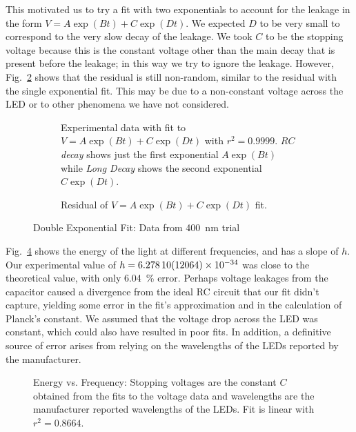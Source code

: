 \documentclass{lab}
\begin{document}
This motivated us to try a fit with two exponentials to account for the leakage
in the form $V = A\exp(Bt) + C\exp(Dt)$. We expected $D$ to be very small to
correspond to the very slow decay of the leakage. We took $C$ to be the stopping
voltage because this is the constant voltage other than the main decay that is
present before the leakage; in this way we try to ignore the leakage. However,
Fig.~\ref{fig:complex_resid} shows that the residual is still non-random,
similar to the residual with the single exponential fit. This may be due to a
non-constant voltage across the LED or to other phenomena we have not
considered.

\begin{figure}[h]
  \centering
  \begin{subfigure}{0.48\textwidth}
    \centering
    
    \caption{Experimental data with fit to $V = A\exp(Bt) + C\exp(Dt)$ with $r^2
      = 0.9999$. \textit{$RC$ decay} shows just the first exponential
      $A\exp(Bt)$ while\textit{ Long Decay} shows the second exponential
      $C\exp(Dt)$.\label{fig:complex_fit}}
  \end{subfigure}
  \hfill
  \begin{subfigure}{0.48\textwidth}
    \centering
    
    \caption{Residual of $V = A\exp(Bt) + C\exp(Dt)$
      fit.\label{fig:complex_resid}}
  \end{subfigure}
  \caption{Double Exponential Fit: Data from \SI{400}{\nano\meter}
    trial\label{fig:complex}}
\end{figure}

Fig.~\ref{fig:evsf} shows the energy of the light at different frequencies, and
has a slope of $h$. Our experimental value of $h = \num{6.2781 +- .12064 e-34}$
was close to the theoretical value, with only \SI{6.04}{\percent} error. Perhaps
voltage leakages from the capacitor caused a divergence from the ideal RC
circuit that our fit didn't capture, yielding some error in the fit's
approximation and in the calculation of Planck's constant. We assumed that the
voltage drop across the LED was constant, which could also have resulted in poor
fits. In addition, a definitive source of error arises from relying on the
wavelengths of the LEDs reported by the manufacturer.

\begin{figure}[h]
  \centering
  
  \caption{Energy vs. Frequency: Stopping voltages are the constant $C$ obtained
    from the fits to the voltage data and wavelengths are the manufacturer
    reported wavelengths of the LEDs. Fit is linear with $r^2 = 0.8664$.\label{fig:evsf}}
\end{figure}
\end{document}
